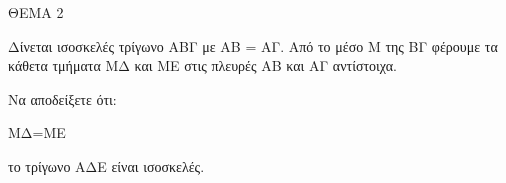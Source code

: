 
ΘΕΜΑ 2

Δίνεται ισοσκελές τρίγωνο ΑΒΓ με ΑΒ = ΑΓ. Από το μέσο Μ της ΒΓ φέρουμε τα κάθετα τμήματα ΜΔ και ΜΕ στις πλευρές ΑΒ και ΑΓ αντίστοιχα.

Να αποδείξετε ότι:

\begin{alist}
\item ΜΔ=ΜΕ 

\item το τρίγωνο ΑΔΕ είναι ισοσκελές. 
\end{alist}
